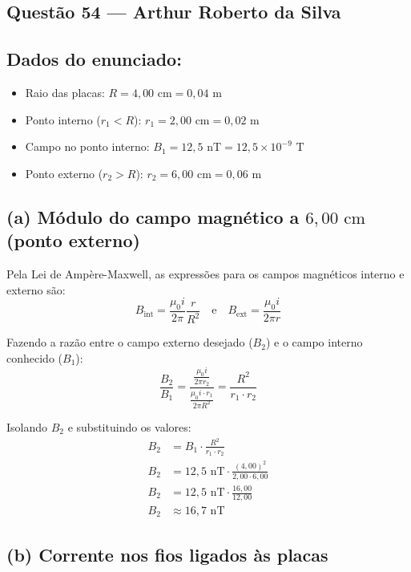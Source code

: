 \documentclass[12pt,a4paper]{article}
\begin{document}
\subsection{Questão 54 — Arthur Roberto da Silva}
\subsection*{Dados do enunciado:}
\begin{itemize}
    \item Raio das placas: $R = 4,00\text{ cm} = 0,04\text{ m}$
    \item Ponto interno ($r_1 < R$): $r_1 = 2,00\text{ cm} = 0,02\text{ m}$
    \item Campo no ponto interno: $B_1 = 12,5\text{ nT} = 12,5 \times 10^{-9}\text{ T}$
    \item Ponto externo ($r_2 > R$): $r_2 = 6,00\text{ cm} = 0,06\text{ m}$
\end{itemize}

\subsection*{(a) Módulo do campo magnético a $6,00\text{ cm}$ (ponto externo)}

Pela Lei de Ampère-Maxwell, as expressões para os campos magnéticos interno e externo são:
\begin{equation*}
B_{\text{int}} = \frac{\mu_0 i}{2\pi} \frac{r}{R^2} \quad \text{e} \quad B_{\text{ext}} = \frac{\mu_0 i}{2\pi r}
\end{equation*}

Fazendo a razão entre o campo externo desejado ($B_2$) e o campo interno conhecido ($B_1$):
\begin{equation*}
\frac{B_2}{B_1} = \frac{\frac{\mu_0 i}{2\pi r_2}}{\frac{\mu_0 i \cdot r_1}{2\pi R^2}} = \frac{R^2}{r_1 \cdot r_2}
\end{equation*}

Isolando $B_2$ e substituindo os valores:
\begin{align*}
B_2 &= B_1 \cdot \frac{R^2}{r_1 \cdot r_2} \\
B_2 &= 12,5\text{ nT} \cdot \frac{(4,00)^2}{2,00 \cdot 6,00} \\
B_2 &= 12,5\text{ nT} \cdot \frac{16,00}{12,00} \\
B_2 &\approx 16,7\text{ nT}
\end{align*}

\subsection*{(b) Corrente nos fios ligados às placas}
\end{document}
